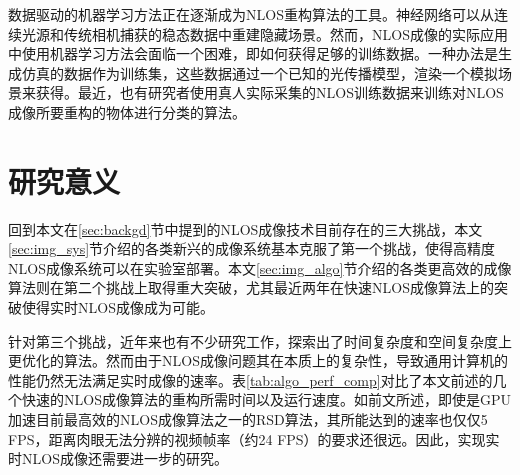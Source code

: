 \documentclass[master]{shtthesis}             %
\begin{document}
数据驱动的机器学习方法正在逐渐成为NLOS重构算法的工具。神经网络可以从连续光源和传统相机捕获的稳态数据中重建隐藏场景\citep{tancik2018data,chen2019steady}。然而，NLOS成像的实际应用中使用机器学习方法会面临一个困难，即如何获得足够的训练数据。一种办法是生成仿真的数据作为训练集，这些数据通过一个已知的光传播模型，渲染一个模拟场景来获得。最近，也有研究者使用真人实际采集的NLOS训练数据来训练对NLOS成像所要重构的物体进行分类的算法\citep{caramazza2018neural}。

\section{研究意义}\label{sec:research_meaning}

回到本文在\ref{sec:backgd}节中提到的NLOS成像技术目前存在的三大挑战，本文\ref{sec:img_sys}节介绍的各类新兴的成像系统基本克服了第一个挑战，使得高精度NLOS成像系统可以在实验室部署。本文\ref{sec:img_algo}节介绍的各类更高效的成像算法则在第二个挑战上取得重大突破，尤其最近两年在快速NLOS成像算法上的突破使得实时NLOS成像成为可能。

针对第三个挑战，近年来也有不少研究工作，探索出了时间复杂度和空间复杂度上更优化的算法。然而由于NLOS成像问题其在本质上的复杂性，导致通用计算机的性能仍然无法满足实时成像的速率。表\ref{tab:algo_perf_comp}对比了本文前述的几个快速的NLOS成像算法的重构所需时间以及运行速度。如前文所述，即使是GPU加速目前最高效的NLOS成像算法之一的RSD算法，其所能达到的速率也仅仅5 FPS\citep{nam2021low}，距离肉眼无法分辨的视频帧率（约24 FPS\citep{read2000restoration}）的要求还很远。因此，实现实时NLOS成像还需要进一步的研究。
\end{document}
